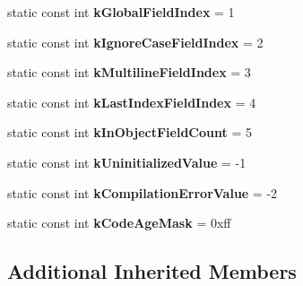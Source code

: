\begin{DoxyCompactItemize}
\item 
\hypertarget{classv8_1_1internal_1_1_j_s_reg_exp_a8a50035ff6f1913378c5d929504564c4}{}static const int {\bfseries k\+Global\+Field\+Index} = 1\label{classv8_1_1internal_1_1_j_s_reg_exp_a8a50035ff6f1913378c5d929504564c4}

\item 
\hypertarget{classv8_1_1internal_1_1_j_s_reg_exp_af1107ecaa8d57e2297aacc7d4da64aab}{}static const int {\bfseries k\+Ignore\+Case\+Field\+Index} = 2\label{classv8_1_1internal_1_1_j_s_reg_exp_af1107ecaa8d57e2297aacc7d4da64aab}

\item 
\hypertarget{classv8_1_1internal_1_1_j_s_reg_exp_a0bad568d45f1fabe5bed27d750ec27db}{}static const int {\bfseries k\+Multiline\+Field\+Index} = 3\label{classv8_1_1internal_1_1_j_s_reg_exp_a0bad568d45f1fabe5bed27d750ec27db}

\item 
\hypertarget{classv8_1_1internal_1_1_j_s_reg_exp_acbd49fd9b1fd11429c5e34bdfa8075a4}{}static const int {\bfseries k\+Last\+Index\+Field\+Index} = 4\label{classv8_1_1internal_1_1_j_s_reg_exp_acbd49fd9b1fd11429c5e34bdfa8075a4}

\item 
\hypertarget{classv8_1_1internal_1_1_j_s_reg_exp_aa2a8207a8ea8c66ba8aaa6b55c5f0f92}{}static const int {\bfseries k\+In\+Object\+Field\+Count} = 5\label{classv8_1_1internal_1_1_j_s_reg_exp_aa2a8207a8ea8c66ba8aaa6b55c5f0f92}

\item 
\hypertarget{classv8_1_1internal_1_1_j_s_reg_exp_a0b4c665fbb52801f03a418dda10b8891}{}static const int {\bfseries k\+Uninitialized\+Value} = -\/1\label{classv8_1_1internal_1_1_j_s_reg_exp_a0b4c665fbb52801f03a418dda10b8891}

\item 
\hypertarget{classv8_1_1internal_1_1_j_s_reg_exp_a1eedcec275d583051a7904e68adf12b2}{}static const int {\bfseries k\+Compilation\+Error\+Value} = -\/2\label{classv8_1_1internal_1_1_j_s_reg_exp_a1eedcec275d583051a7904e68adf12b2}

\item 
\hypertarget{classv8_1_1internal_1_1_j_s_reg_exp_ae6261c435a2c70c96ab1ba11a6b5d51b}{}static const int {\bfseries k\+Code\+Age\+Mask} = 0xff\label{classv8_1_1internal_1_1_j_s_reg_exp_ae6261c435a2c70c96ab1ba11a6b5d51b}

\end{DoxyCompactItemize}
\subsection*{Additional Inherited Members}


